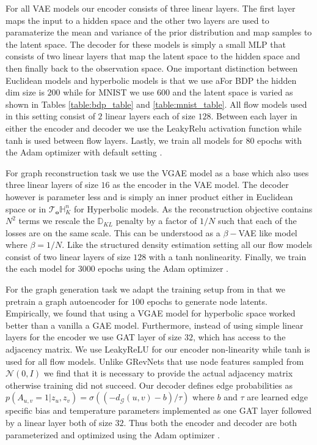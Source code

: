 For all VAE models our encoder consists of three linear layers. The first layer maps the input to a hidden space and the other two layers are used to paramaterize the mean and variance of the prior distribution and map samples to the latent space. The decoder for these models is simply a small MLP that consists of two linear layers that map the latent space to the hidden space and then finally back to the observation space. One important distinction between Euclidean models and hyperbolic models is that we use aFor BDP the hidden dim size is $200$ while for MNIST we use $600$ and the latent space is varied as shown in Tables \ref{table:bdp_table} and \ref{table:mnist_table}. All flow models used in this setting consist of $2$ linear layers each of size $128$. Between each layer in either the encoder and decoder we use the LeakyRelu \cite{xu2015empirical} activation function while tanh is used between flow layers. Lastly, we train all models for $80$ epochs with the Adam optimizer with default setting \cite{kingma2014adam}.

For graph reconstruction task we use the VGAE model as a base \cite{kipf2016variational} which also uses three linear layers of size $16$ as the encoder in the VAE model. The decoder however is parameter less and is simply an inner product either in Euclidean space or in $\mathcal{T}_{\textbf{o}}\mathbb{H}^n_K$ for Hyperbolic models. As the reconstruction objective contains $N^2$ terms we rescale the $\mathbb{D}_{KL}$ penalty by a factor of $1/N$ such that each of the losses are on the same scale. This can be understood as a $\beta-$VAE like model where $\beta = 1/N$. Like the structured density estimation setting all our flow models consist of two linear layers of size $128$ with a tanh nonlinearity. Finally, we train the each model for $3000$ epochs using the Adam optimizer \cite{kingma2014adam}. 

For the graph generation task we adapt the training setup from \cite{liu2019graph} in that we pretrain a graph autoencoder for $100$ epochs to generate node latents. Empirically, we found that using a VGAE model for hyperbolic space worked better than a vanilla a GAE model. Furthermore, instead of using simple linear layers for the encoder we use GAT \cite{velivckovic2017graph} layer of size $32$, which has access to the adjacency matrix. We use LeakyReLU for our encoder non-linearity while tanh is used for all flow models. Unlike GRevNets that use node features sampled from $\mathcal{N}(0,I)$ we find that it is necessary to provide the actual adjacency matrix otherwise training did not succeed. Our decoder defines edge probabilities as $p(A_{u,v}=1|z_u,z_v) = \sigma((-d_{\mathcal{G}}(u,v) - b)/\tau)$ where $b$ and $\tau$ are learned edge specific bias and temperature parameters implemented as one GAT layer followed by a linear layer both of size $32$. Thus both the encoder and decoder are both parameterized and optimized using the Adam optimizer \cite{kingma2014adam}. 

